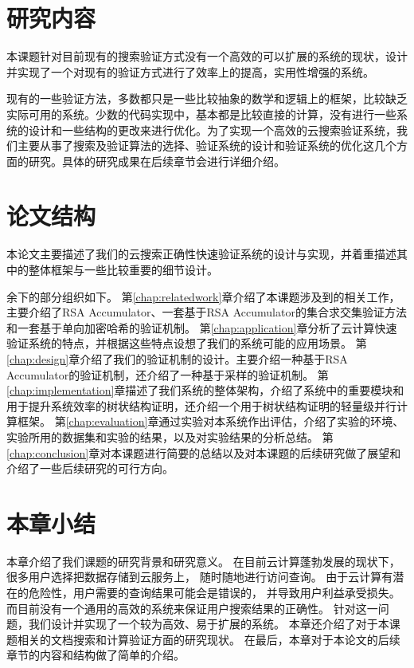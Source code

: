 \section{研究内容}
本课题针对目前现有的搜索验证方式没有一个高效的可以扩展的系统的现状，设计并实现了一个对现有的验证方式进行了效率上的提高，实用性增强的系统。

现有的一些验证方法，多数都只是一些比较抽象的数学和逻辑上的框架，比较缺乏实际可用的系统。少数的代码实现中，基本都是比较直接的计算，没有进行一些系统的设计和一些结构的更改来进行优化。为了实现一个高效的云搜索验证系统，我们主要从事了搜索及验证算法的选择、验证系统的设计和验证系统的优化这几个方面的研究。具体的研究成果在后续章节会进行详细介绍。

\section{论文结构}
本论文主要描述了我们的云搜索正确性快速验证系统的设计与实现，并着重描述其中的整体框架与一些比较重要的细节设计。

余下的部分组织如下。
第\ref{chap:relatedwork}章介绍了本课题涉及到的相关工作，主要介绍了RSA Accumulator、一套基于RSA Accumulator的集合求交集验证方法和一套基于单向加密哈希的验证机制。
第\ref{chap:application}章分析了云计算快速验证系统的特点，并根据这些特点设想了我们的系统可能的应用场景。
第\ref{chap:design}章介绍了我们的验证机制的设计。主要介绍一种基于RSA Accumulator的验证机制，还介绍了一种基于采样的验证机制。
第\ref{chap:implementation}章描述了我们系统的整体架构，介绍了系统中的重要模块和用于提升系统效率的树状结构证明，还介绍一个用于树状结构证明的轻量级并行计算框架。
第\ref{chap:evaluation}章通过实验对本系统作出评估，介绍了实验的环境、实验所用的数据集和实验的结果，以及对实验结果的分析总结。
第\ref{chap:conclusion}章对本课题进行简要的总结以及对本课题的后续研究做了展望和介绍了一些后续研究的可行方向。


\section{本章小结}
本章介绍了我们课题的研究背景和研究意义。
在目前云计算蓬勃发展的现状下，很多用户选择把数据存储到云服务上，
随时随地进行访问查询。
由于云计算有潜在的危险性，用户需要的查询结果可能会是错误的，
并导致用户利益承受损失。
而目前没有一个通用的高效的系统来保证用户搜索结果的正确性。
针对这一问题，我们设计并实现了一个较为高效、易于扩展的系统。
本章还介绍了对于本课题相关的文档搜索和计算验证方面的研究现状。
在最后，本章对于本论文的后续章节的内容和结构做了简单的介绍。
